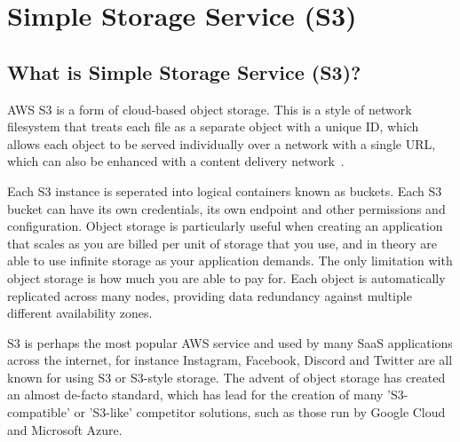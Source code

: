 \chapter{Simple Storage Service (S3)}\label{ch:simple-storage-service}

\section{What is Simple Storage Service (S3)?}
AWS S3 is a form of cloud-based object storage.
This is a style of network filesystem that treats each file as a separate object with a unique ID, which allows each
object to be served individually over a network with a single URL, which can also be enhanced with a content delivery
network~\parencite{amazon2022cloud}.

Each S3 instance is seperated into logical containers known as buckets.
Each S3 bucket can have its own credentials, its own endpoint and other permissions and configuration.
Object storage is particularly useful when creating an application that scales as you are billed per unit of storage
that you use, and in theory are able to use infinite storage as your application demands.
The only limitation with object storage is how much you are able to pay for.
Each object is automatically replicated across many nodes, providing data redundancy against multiple different
availability zones.

S3 is perhaps the most popular AWS service and used by many SaaS applications across the internet, for instance
Instagram, Facebook, Discord and Twitter are all known for using S3 or S3-style storage.
The advent of object storage has created an almost de-facto standard, which has lead for the creation of many
'S3-compatible' or 'S3-like' competitor solutions, such as those run by Google Cloud and Microsoft Azure.

